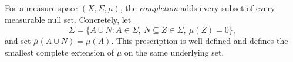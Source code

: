 
For a measure space $(X,\Sigma,\mu)$, the \emph{completion} adds every subset of every measurable null set. Concretely, let
\[
\overline\Sigma=\{A\cup N:A\in\Sigma,\ N\subseteq Z\in\Sigma,\ \mu(Z)=0\},
\]
and set $\overline\mu(A\cup N)=\mu(A)$. This prescription is well-defined and defines the smallest complete extension of $\mu$ on the same underlying set.
